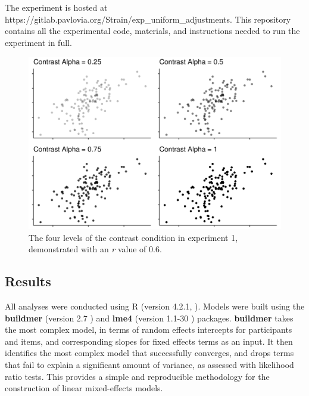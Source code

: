\documentclass[preprint, 3p,
authoryear]{elsarticle} %
\begin{document}
The experiment is hosted at
https://gitlab.pavlovia.org/Strain/exp\_uniform\_adjustments. This
repository contains all the experimental code, materials, and
instructions needed to run the experiment in full.

\begin{figure}

\includegraphics[width=1\linewidth]{plot_examples/uniform_adjustments_plot_examples} \hfill{}

\caption{\label{e1-example-plots}The four levels of the contrast condition in experiment 1, demonstrated with an \textit{r} value of 0.6.}\label{fig:e1-example-plots}
\end{figure}

\hypertarget{results}{%
\subsection{Results}\label{results}}

All analyses were conducted using R (version 4.2.1, \citep{r_core}).
Models were built using the \textbf{buildmer} (version 2.7
\citep{voeten_buildmer_2022}) and \textbf{lme4} (version 1.1-30
\citep{bates_lme4_2015}) packages. \textbf{buildmer} takes the most
complex model, in terms of random effects intercepts for participants
and items, and corresponding slopes for fixed effects terms
\citep{barr_random_2013} as an input. It then identifies the most
complex model that successfully converges, and drops terms that fail to
explain a significant amount of variance, as assessed with likelihood
ratio tests. This provides a simple and reproducible methodology for the
construction of linear mixed-effects models.
\end{document}
